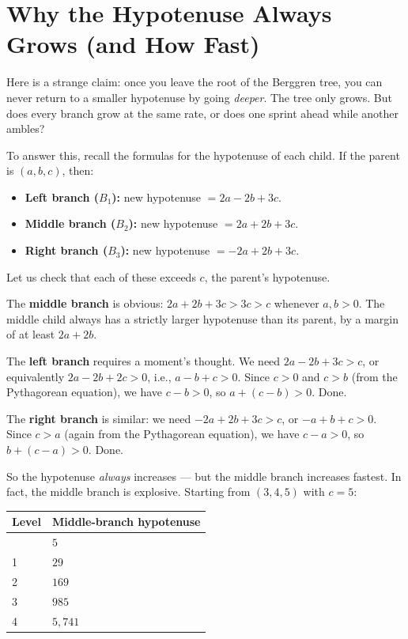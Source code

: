 \section{Why the Hypotenuse Always Grows (and How Fast)}\label{ch3-why-the-hypotenuse-always-grows-and-how-fast}

Here is a strange claim: once you leave the root of the Berggren tree, you can never return to a smaller hypotenuse by going \emph{deeper}. The tree only grows. But does every branch grow at the same rate, or does one sprint ahead while another ambles?

To answer this, recall the formulas for the hypotenuse of each child. If the parent is \((a, b, c)\), then:

\begin{itemize}

\item
  \textbf{Left branch (\(B_1\)):} new hypotenuse \(= 2a - 2b + 3c\).
\item
  \textbf{Middle branch (\(B_2\)):} new hypotenuse \(= 2a + 2b + 3c\).
\item
  \textbf{Right branch (\(B_3\)):} new hypotenuse \(= -2a + 2b + 3c\).
\end{itemize}

Let us check that each of these exceeds \(c\), the parent's hypotenuse.

The \textbf{middle branch} is obvious: \(2a + 2b + 3c > 3c > c\) whenever \(a, b > 0\). The middle child always has a strictly larger hypotenuse than its parent, by a margin of at least \(2a + 2b\).

The \textbf{left branch} requires a moment's thought. We need \(2a - 2b + 3c > c\), or equivalently \(2a - 2b + 2c > 0\), i.e., \(a - b + c > 0\). Since \(c > 0\) and \(c > b\) (from the Pythagorean equation), we have \(c - b > 0\), so \(a + (c - b) > 0\). Done.

The \textbf{right branch} is similar: we need \(-2a + 2b + 3c > c\), or \(-a + b + c > 0\). Since \(c > a\) (again from the Pythagorean equation), we have \(c - a > 0\), so \(b + (c - a) > 0\). Done.

So the hypotenuse \emph{always} increases --- but the middle branch increases fastest. In fact, the middle branch is explosive. Starting from \((3, 4, 5)\) with \(c = 5\):

\begin{longtable}[]{@{}ll@{}}
\toprule\noalign{}
Level & Middle-branch hypotenuse \\
\midrule\noalign{}
\endhead
\bottomrule\noalign{}
\endlastfoot
0 & \(5\) \\
1 & \(29\) \\
2 & \(169\) \\
3 & \(985\) \\
4 & \(5{,}741\) \\
\end{longtable}

